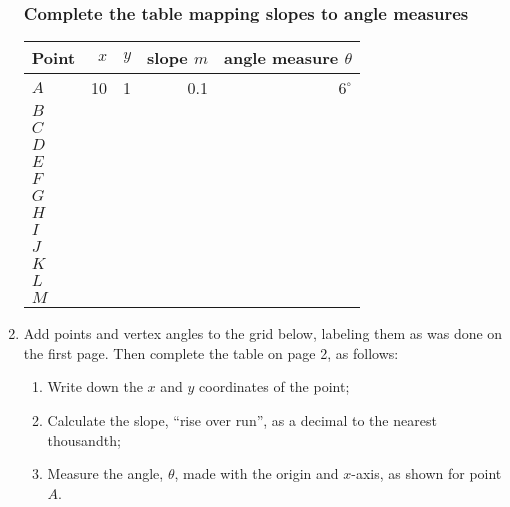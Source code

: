 \documentclass[12pt, twoside]{article}
\begin{document}
\begin{enumerate}
    
\newpage 
\subsubsection*{Complete the table mapping slopes to angle measures}

\begin{tabular}{|l|r@{\hskip 1.5cm}r@{\hskip 1cm}rr}
  \hline
  Point & $x$ & $y$  & slope $m$ & angle measure $\theta$\\ 
  \hline 
  $A$ & 10 & 1 & 0.1 & $6^\circ$ \\[0.5cm] 
  $B$ &  &  &  &  \\[0.5cm] 
  $C$ &  &  &  &  \\[0.5cm] 
  \hline 
  $D$ &  &  &  &  \\[0.5cm] 
  $E$ &  &  &  &  \\[0.5cm] 
  $F$ &  &  &  &  \\[0.5cm] 
  \hline 
  $G$ &  &  &  &  \\[0.5cm] 
  $H$ &  &  &  &  \\[0.5cm] 
  $I$ &  &  &  &  \\[0.5cm] 
  \hline 
  $J$ &  &  &  &  \\[0.5cm] 
  $K$ &  &  &  &  \\[0.5cm] 
  $L$ &  &  &  &  \\[0.5cm] 
  \hline   
  $M$ &  &  &  &  \\[0.5cm]
\end{tabular}

\newpage
\item Add points and vertex angles to the grid below, labeling them as was done on the first page. Then complete the table on page 2, as follows:
\begin{enumerate}
  \item Write down the $x$ and $y$ coordinates of the point;
  \item Calculate the slope, ``rise over run'', as a decimal to the nearest thousandth;
  \item Measure the angle, $\theta$, made with the origin and $x$-axis, as shown for point $A$.
\end{enumerate}
\begin{flushright}
    \end{flushright}


\end{enumerate}
\end{document}
